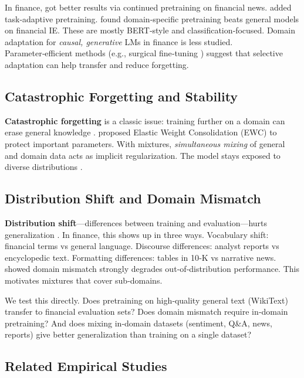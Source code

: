 In finance, \textcite{araci2019finbert} got better results via continued pretraining on financial news. \textcite{yang2020finbert} added task‑adaptive pretraining. \textcite{huang2023finbert} found domain‑specific pretraining beats general models on financial IE. These are mostly BERT‑style and classification‑focused. Domain adaptation for \textit{causal, generative} LMs in finance is less studied. Parameter‑efficient methods (e.g., surgical fine‑tuning \parencite{lee2022surgical}) suggest that selective adaptation can help transfer and reduce forgetting.

\subsection{Catastrophic Forgetting and Stability}

\textbf{Catastrophic forgetting} is a classic issue: training further on a domain can erase general knowledge \parencite{mccloskey1989catastrophic, french1999catastrophic}. \textcite{kirkpatrick2017overcoming} proposed Elastic Weight Consolidation (EWC) to protect important parameters. With mixtures, \textit{simultaneous mixing} of general and domain data acts as implicit regularization. The model stays exposed to diverse distributions \parencite{arivazhagan2019massively,raffel2020exploring}.

\subsection{Distribution Shift and Domain Mismatch}

\textbf{Distribution shift}—differences between training and evaluation—hurts generalization \parencite{quinonero2009dataset}. In finance, this shows up in three ways. Vocabulary shift: financial terms vs general language. Discourse differences: analyst reports vs encyclopedic text. Formatting differences: tables in 10‑K vs narrative news. \textcite{aharoni2020unsupervised} showed domain mismatch strongly degrades out‑of‑distribution performance. This motivates mixtures that cover sub‑domains.

We test this directly. Does pretraining on high‑quality general text (WikiText) transfer to financial evaluation sets? Does domain mismatch require in‑domain pretraining? And does mixing in‑domain datasets (sentiment, Q\&A, news, reports) give better generalization than training on a single dataset?

\subsection{Related Empirical Studies}

